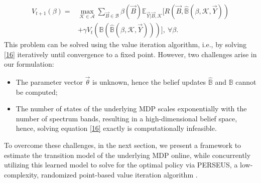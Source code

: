 \documentclass[10pt,twocolumn]{IEEEtran}
\begin{document}
\begin{align}\label{16}
\nonumber
        V_{t+1}(\beta) = &\max_{\mathcal{K} {\in} \mathcal{A}} \sum_{\vec{B} {\in} \mathcal{B}} \beta(\vec{B}) \mathbb{E}_{\vec{Y}|\vec{B}, \mathcal{K}} \Big[R(\vec{B}, \hat{\mathbb{B}}(\beta, \mathcal{K}, \vec{Y}))\\ &+\gamma V_{t}(\mathbb{B}(\hat{\mathbb{B}}(\beta, \mathcal{K}, \vec{Y})))\Big],\ \forall \beta.
\end{align}
This problem can be solved using the value iteration algorithm, i.e., by solving \eqref{16} iteratively until convergence to a fixed point. However, two challenges arise in our formulation:
\begin{itemize}
\item The parameter vector $\vec{\theta}$ is unknown, hence the belief updates 
$\hat{\mathbb B}$ and $\mathbb B$ cannot be computed;
\item The number of states of the underlying MDP scales exponentially with the number of spectrum bands, resulting in a high-dimensional belief space, hence, solving equation \eqref{16} exactly is computationally infeasible.
\end{itemize}
To overcome these challenges, in the next section, we present a framework to estimate the transition model of the underlying MDP online, while concurrently utilizing this learned model to solve for the optimal policy via PERSEUS, a low-complexity, randomized point-based value iteration algorithm \cite{DBLP:journals/corr/abs-1109-2145}.
\vspace{-4mm}
\end{document}
